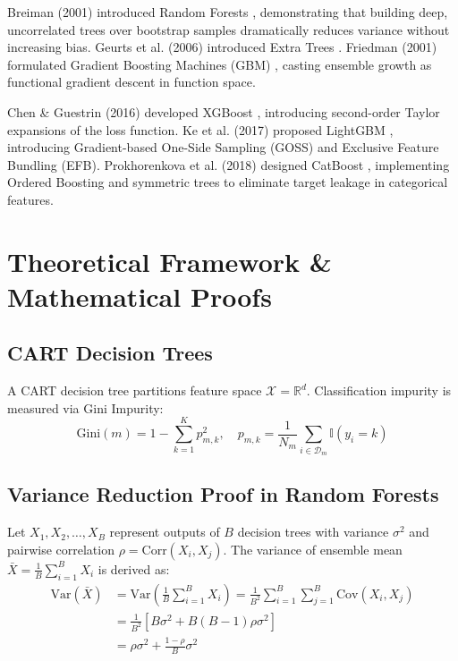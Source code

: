 \documentclass[10pt,journal,compsoc]{IEEEtran}
\begin{document}
Breiman (2001) introduced Random Forests \cite{breiman2001}, demonstrating that building deep, uncorrelated trees over bootstrap samples dramatically reduces variance without increasing bias. Geurts et al. (2006) introduced Extra Trees \cite{geurts2006}. Friedman (2001) formulated Gradient Boosting Machines (GBM) \cite{friedman2001}, casting ensemble growth as functional gradient descent in function space.

Chen \& Guestrin (2016) developed XGBoost \cite{chen2016}, introducing second-order Taylor expansions of the loss function. Ke et al. (2017) proposed LightGBM \cite{ke2017}, introducing Gradient-based One-Side Sampling (GOSS) and Exclusive Feature Bundling (EFB). Prokhorenkova et al. (2018) designed CatBoost \cite{prokhorenkova2018}, implementing Ordered Boosting and symmetric trees to eliminate target leakage in categorical features.

\section{Theoretical Framework \& Mathematical Proofs}

\subsection{CART Decision Trees}
A CART decision tree partitions feature space $\mathcal{X} = \mathbb{R}^d$. Classification impurity is measured via Gini Impurity:
\begin{equation}
\text{Gini}(m) = 1 - \sum_{k=1}^K p_{m,k}^2, \quad p_{m,k} = \frac{1}{N_m} \sum_{i \in \mathcal{D}_m} \mathbb{I}(y_i = k)
\end{equation}

\subsection{Variance Reduction Proof in Random Forests}
Let $X_1, X_2, \dots, X_B$ represent outputs of $B$ decision trees with variance $\sigma^2$ and pairwise correlation $\rho = \text{Corr}(X_i, X_j)$. The variance of ensemble mean $\bar{X} = \frac{1}{B} \sum_{i=1}^B X_i$ is derived as:
\begin{align}
\text{Var}(\bar{X}) &= \text{Var}\left( \frac{1}{B} \sum_{i=1}^B X_i \right) = \frac{1}{B^2} \sum_{i=1}^B \sum_{j=1}^B \text{Cov}(X_i, X_j) \nonumber \\
&= \frac{1}{B^2} \left[ B \sigma^2 + B(B-1) \rho \sigma^2 \right] \nonumber \\
&= \rho \sigma^2 + \frac{1 - \rho}{B} \sigma^2
\end{align}
\end{document}
